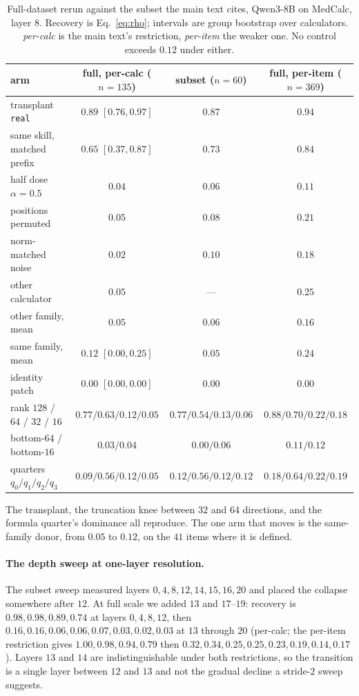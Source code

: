 \documentclass{article}
\begin{document}
\begin{table}[h]
\caption{Full-dataset rerun against the subset the main text cites, Qwen3-8B on
MedCalc, layer $8$. Recovery is Eq.~\ref{eq:rho}; intervals are group bootstrap
over calculators. \emph{per-calc} is the main text's restriction, \emph{per-item}
the weaker one. No control exceeds $0.12$ under either.}
\label{tab:fullscale}
\centering
\small
\begin{tabular}{lccc}
\toprule
arm & full, per-calc ($n=135$) & subset ($n=60$) & full, per-item ($n=369$) \\
\midrule
transplant \texttt{real} & $\mathbf{0.89}$ $[0.76,0.97]$ & $0.87$ & $0.94$ \\
same skill, matched prefix & $0.65$ $[0.37,0.87]$ & $0.73$ & $0.84$ \\
\midrule
half dose $\alpha=0.5$ & $0.04$ & $0.06$ & $0.11$ \\
positions permuted & $0.05$ & $0.08$ & $0.21$ \\
norm-matched noise & $0.02$ & $0.10$ & $0.18$ \\
other calculator & $0.05$ & --- & $0.25$ \\
other family, mean & $0.05$ & $0.06$ & $0.16$ \\
same family, mean & $0.12$ $[0.00,0.25]$ & $0.05$ & $0.24$ \\
identity patch & $0.00$ $[0.00,0.00]$ & $0.00$ & $0.00$ \\
\midrule
rank $128$ / $64$ / $32$ / $16$ & $0.77/0.63/0.12/0.05$ & $0.77/0.54/0.13/0.06$ & $0.88/0.70/0.22/0.18$ \\
bottom-$64$ / bottom-$16$ & $0.03/0.04$ & $0.00/0.06$ & $0.11/0.12$ \\
quarters $q_0/q_1/q_2/q_3$ & $0.09/\mathbf{0.56}/0.12/0.05$ & $0.12/0.56/0.12/0.12$ & $0.18/0.64/0.22/0.19$ \\
\bottomrule
\end{tabular}
\end{table}

The transplant, the truncation knee between $32$ and $64$ directions, and the
formula quarter's dominance all reproduce. The one arm that moves is the
same-family donor, from $0.05$ to $0.12$, on the $41$ items where it is defined.

\paragraph{The depth sweep at one-layer resolution.} The subset sweep measured
layers $0,4,8,12,14,15,16,20$ and placed the collapse somewhere after $12$.
At full scale we added $13$ and $17$--$19$:
recovery is $0.98,0.98,0.89,0.74$ at layers $0,4,8,12$, then
$0.16,0.16,0.06,0.06,0.07,0.03,0.02,0.03$ at $13$ through $20$ (per-calc; the
per-item restriction gives $1.00,0.98,0.94,0.79$ then
$0.32,0.34,0.25,0.25,0.23,0.19,0.14,0.17$). Layers $13$ and $14$ are
indistinguishable under both restrictions, so the transition is a single layer
between $12$ and $13$ and not the gradual decline a stride-$2$ sweep suggests.
\end{document}
